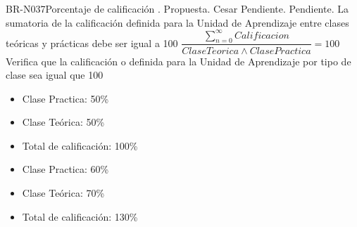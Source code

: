 \begin{BusinessRule}{BR-N037}{Porcentaje de calificación}
	{\bcCondition}    %
	{\btEnabler}     %
	{\blControlling}    %
	.
	\BRItem[Estado] Propuesta.
	 Cesar
	 Pendiente.
	 Pendiente.
	\BRItem[Descripción] La sumatoria de la calificación definida para la Unidad de Aprendizaje entre clases teóricas y prácticas debe ser igual a 100
	\BRItem[Sentencia]  $\dfrac{\sum^{\infty}_{n=0}Calificacion}{ClaseTeorica \wedge ClasePractica} = 100$
	\BRItem[Motivación] Verifica que la calificación o definida para la Unidad de Aprendizaje por tipo de clase sea igual que 100
		 \cdtEmpty
		\begin{itemize}
			\item Clase Practica: 50\%
			\item Clase Teórica: 50\%
			\item Total de calificación: 100\% 
		\end{itemize}
		 \cdtEmpty
		\begin{itemize}
			\item Clase Practica: 60\%
			\item Clase Teórica: 70\%
			\item Total de calificación: 130\%
		\end{itemize}
\end{BusinessRule}

